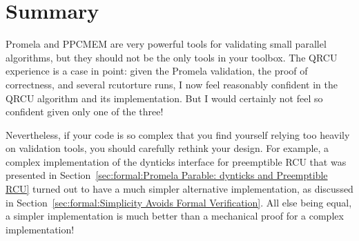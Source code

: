 



\section{Summary}
\label{sec:formal:Summary}

Promela and PPCMEM are very powerful tools for validating small
parallel algorithms, but they should not be the only tools in your
toolbox.
The QRCU experience is a case in point: given the Promela validation,
the proof of correctness, and several
rcutorture
runs, I now feel
reasonably confident in the QRCU algorithm and its implementation.
But I would certainly not feel so confident given only one of the three!

Nevertheless, if your code is so complex that you find yourself
relying too heavily on validation
tools, you should carefully rethink your design.
For example, a complex implementation of the dynticks interface for
preemptible RCU that was presented in
Section~\ref{sec:formal:Promela Parable: dynticks and Preemptible RCU}
turned out to
have a much simpler alternative implementation, as discussed in
Section~\ref{sec:formal:Simplicity Avoids Formal Verification}.
All else being equal, a simpler implementation is much better than
a mechanical proof for a complex implementation!
